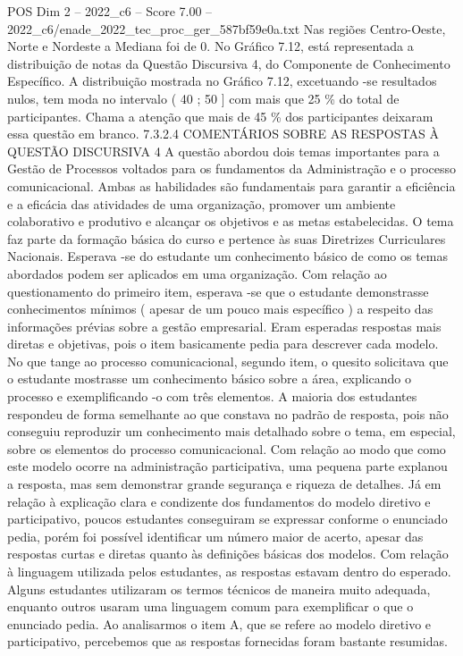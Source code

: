 \begin{textsample}{POS Dim 2 – 2022\_c6 – Score 7.00 – 2022\_c6/enade\_2022\_tec\_proc\_ger\_587bf59e0a.txt}
Nas regiões Centro-Oeste, Norte e Nordeste a Mediana foi de 0.
No Gráfico 7.12, está representada a distribuição de notas da Questão Discursiva 4, do Componente de Conhecimento Específico.
A distribuição mostrada no Gráfico 7.12, excetuando -se resultados nulos, tem moda no intervalo ( 40 ; 50 ] com mais que 25 \% do total de participantes.
Chama a atenção que mais de 45 \% dos participantes deixaram essa questão em branco. 7.3.2.4 COMENTÁRIOS SOBRE AS RESPOSTAS À QUESTÃO DISCURSIVA 4 A questão abordou dois temas importantes para a Gestão de Processos voltados para os fundamentos da Administração e o processo comunicacional.
Ambas as habilidades são fundamentais para garantir a eficiência e a eficácia das atividades de uma organização, promover um ambiente colaborativo e produtivo e alcançar os objetivos e as metas estabelecidas.
O tema faz parte da formação básica do curso e pertence às suas Diretrizes Curriculares Nacionais.
Esperava -se do estudante um conhecimento básico de como os temas abordados podem ser aplicados em uma organização.
Com relação ao questionamento do primeiro item, esperava -se que o estudante demonstrasse conhecimentos mínimos ( apesar de um pouco mais específico ) a respeito das informações prévias sobre a gestão empresarial.
Eram esperadas respostas mais diretas e objetivas, pois o item basicamente pedia para descrever cada modelo.
No que tange ao processo comunicacional, segundo item, o quesito solicitava que o estudante mostrasse um conhecimento básico sobre a área, explicando o processo e exemplificando -o com três elementos.
A maioria dos estudantes respondeu de forma semelhante ao que constava no padrão de resposta, pois não conseguiu reproduzir um conhecimento mais detalhado sobre o tema, em especial, sobre os elementos do processo comunicacional.
Com relação ao modo que como este modelo ocorre na administração participativa, uma pequena parte explanou a resposta, mas sem demonstrar grande segurança e riqueza de detalhes.
Já em relação à explicação clara e condizente dos fundamentos do modelo diretivo e participativo, poucos estudantes conseguiram se expressar conforme o enunciado pedia, porém foi possível identificar um número maior de acerto, apesar das respostas curtas e diretas quanto às definições básicas dos modelos.
Com relação à linguagem utilizada pelos estudantes, as respostas estavam dentro do esperado.
Alguns estudantes utilizaram os termos técnicos de maneira muito adequada, enquanto outros usaram uma linguagem comum para exemplificar o que o enunciado pedia.
Ao analisarmos o item A, que se refere ao modelo diretivo e participativo, percebemos que as respostas fornecidas foram bastante resumidas.

\end{textsample}
